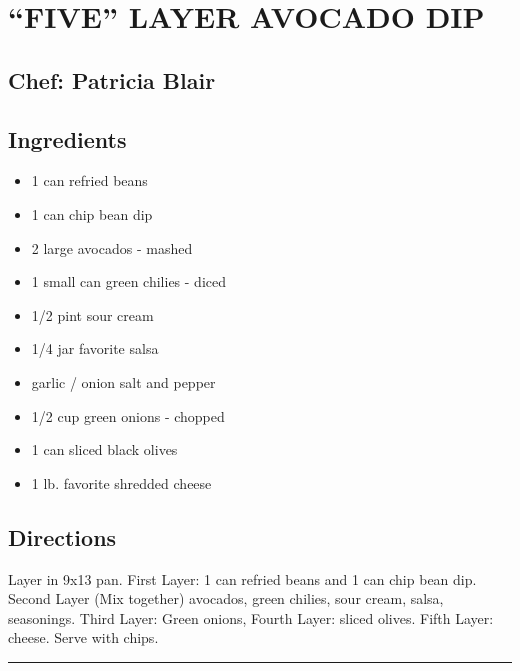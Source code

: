 \documentclass[
]{book}
\providecommand{\tightlist}{%
  \setlength{\itemsep}{0pt}\setlength{\parskip}{0pt}}
\begin{document}
\hypertarget{five-layer-avocado-dip}{%
\section*{``FIVE'' LAYER AVOCADO DIP}\label{five-layer-avocado-dip}}

\hypertarget{chef-patricia-blair-2}{%
\subsection*{Chef: Patricia Blair}\label{chef-patricia-blair-2}}

\hypertarget{ingredients-5}{%
\subsection*{Ingredients}\label{ingredients-5}}

\begin{itemize}
\tightlist
\item
  1 can refried beans
\item
  1 can chip bean dip
\item
  2 large avocados - mashed
\item
  1 small can green chilies - diced
\item
  1/2 pint sour cream
\item
  1/4 jar favorite salsa
\item
  garlic / onion salt and pepper
\item
  1/2 cup green onions - chopped
\item
  1 can sliced black olives
\item
  1 lb. favorite shredded cheese
\end{itemize}

\hypertarget{directions-5}{%
\subsection*{Directions}\label{directions-5}}

Layer in 9x13 pan. First Layer: 1 can refried beans and 1 can chip bean dip.
Second Layer (Mix together) avocados, green chilies, sour cream, salsa, seasonings.
Third Layer: Green onions, Fourth Layer: sliced olives.
Fifth Layer: cheese. Serve with chips.

\begin{center}\rule{0.5\linewidth}{0.5pt}\end{center}
\end{document}
